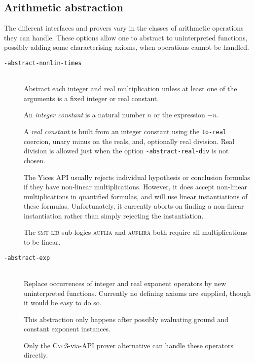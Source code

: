 \documentclass[12pt,fleqn]{article}
\newcommand{\cvcthree}{\textsc{Cvc}3}
\newcommand{\yices}{Yices}
\newcommand{\smtlib}{\textsc{smt-lib}}
\newcommand{\optionb}[1]{\item[\texttt{-{#1}}]\ \\}
\begin{document}
\subsection{Arithmetic abstraction}
The different interfaces and provers vary in the classes of arithmetic
operations they can handle.  These options allow one to abstract to
uninterpreted functions, possibly adding some characterising axioms,
when operations cannot be handled.

\begin{description}
\optionb{abstract-nonlin-times}
  Abstract each integer and real multiplication unless at least
  one of the arguments is a fixed integer or real constant.

  An \emph{integer constant} is a natural number $n$ or the expression $-n$.
  
  A \emph{real constant} is built from an integer constant using the
  \texttt{to-real} coercion, unary minus on the reals, and, optionally
  real division.  Real division is allowed just when the option 
  \texttt{-abstract-real-div} is not chosen.

  The \yices{} API usually rejects individual hypothesis or conclusion
  formulas if they have non-linear multiplications.  However, it does
  accept non-linear multiplications in quantified formulas, and
  will use linear instantiations of these formulas. 
  Unfortunately, it currently aborts on finding a non-linear
  instantiation rather than simply rejecting the instantiation.

  The \smtlib{} sub-logics \textsc{auflia} and \textsc{auflira} both 
  require all multiplications to be linear.

\optionb{abstract-exp}
  Replace occurrences of integer and real exponent operators by new 
  uninterpreted functions.  Currently no defining axioms are supplied, though
  it would be easy to do so. 

  This abstraction only happens after possibly evaluating ground 
  and constant exponent instances.

  Only the \cvcthree{}-via-API prover alternative can handle these
  operators directly.


\end{description}
\end{document}
